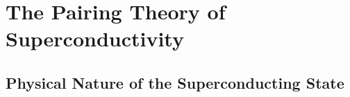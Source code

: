 \chapter{The Pairing Theory of Superconductivity} %
\label{cha:The Pairing Theory of Superconductivity}
\section{Physical Nature of the Superconducting State} %
\label{sec:Physical Nature of the Superconducting State}

